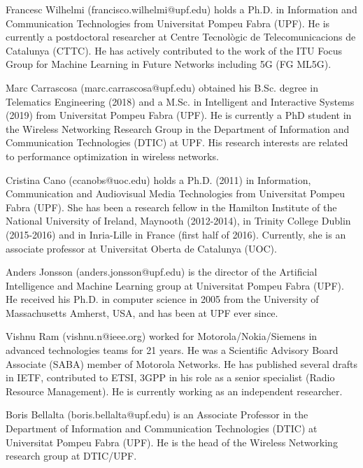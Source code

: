 \documentclass[journal]{IEEEtran}
\begin{document}
	
	
	\begin{IEEEbiographynophoto}{Francesc Wilhelmi}
		(francisco.wilhelmi@upf.edu) holds a Ph.D. in Information and Communication Technologies from Universitat Pompeu Fabra (UPF). He is currently a postdoctoral researcher at Centre Tecnològic de Telecomunicacions de Catalunya (CTTC). He has actively contributed to the work of the ITU Focus Group for Machine Learning in Future Networks including 5G (FG ML5G).
	\end{IEEEbiographynophoto}
	\begin{IEEEbiographynophoto}{Marc Carrascosa}
		(marc.carrascosa@upf.edu) obtained his B.Sc. degree in Telematics Engineering (2018) and a M.Sc. in Intelligent and Interactive Systems (2019) from Universitat Pompeu Fabra (UPF). He is currently a PhD student in the Wireless Networking Research Group in the Department of Information and Communication Technologies (DTIC) at UPF. His research interests are related to performance optimization in wireless networks.
	\end{IEEEbiographynophoto}
	\begin{IEEEbiographynophoto}{Cristina Cano}
		(ccanobs@uoc.edu) holds a Ph.D. (2011) in Information, Communication and Audiovisual Media Technologies from Universitat Pompeu Fabra (UPF). She has been a research fellow in the Hamilton Institute of the National University of Ireland, Maynooth (2012-2014), in Trinity College Dublin (2015-2016) and in Inria-Lille in France (first half of 2016). Currently, she is an associate professor at Universitat Oberta de Catalunya (UOC). 
	\end{IEEEbiographynophoto}
	\begin{IEEEbiographynophoto}{Anders Jonsson} (anders.jonsson@upf.edu) is the director of the Artificial Intelligence and Machine Learning group at Universitat Pompeu Fabra (UPF). He received his Ph.D. in computer science in 2005 from the University of Massachusetts Amherst, USA, and has been at UPF ever since.
	\end{IEEEbiographynophoto}
	\begin{IEEEbiographynophoto}{Vishnu Ram}
		(vishnu.n@ieee.org) worked for Motorola/Nokia/Siemens in advanced technologies teams for 21 years. He was a Scientific Advisory Board Associate (SABA) member of Motorola Networks. He has published several drafts in IETF, contributed to ETSI, 3GPP in his role as a senior specialist (Radio Resource Management). He is currently working as an independent researcher.	
	\end{IEEEbiographynophoto}
	\begin{IEEEbiographynophoto}{Boris Bellalta}
		(boris.bellalta@upf.edu) is an Associate Professor in the Department of Information and Communication Technologies (DTIC) at Universitat Pompeu Fabra (UPF). He is the head of the Wireless Networking research group at DTIC/UPF.
	\end{IEEEbiographynophoto}
	\vfill
	
\end{document}
